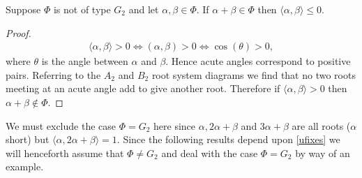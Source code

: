\begin{lemma} \label{ufixes} Suppose $\Phi$ is not of type $G_2$ and let $\alpha,\beta\in\Phi$. If $\alpha + \beta \in \Phi$ then $\langle \alpha, \beta \rangle \leq 0$.
\end{lemma}
\begin{proof}
\begin{eqnarray*}
\langle \alpha, \beta \rangle > 0 \Longleftrightarrow (\alpha, \beta) >0 \Longleftrightarrow \cos(\theta) > 0,
\end{eqnarray*}
where $\theta$ is the angle between $\alpha$ and $\beta$. Hence acute angles correspond to positive pairs. Referring to the $A_2$ and $B_2$ root system diagrams we find that no two roots meeting at an acute angle add to give another root. Therefore if $\langle \alpha, \beta \rangle > 0$ then $\alpha + \beta \notin \Phi$.
\end{proof}

We must exclude the case $\Phi = G_2$ here since $\alpha, 2\alpha + \beta$ and $3\alpha + \beta$ are all roots ($\alpha$ short) but $\langle \alpha, 2\alpha + \beta \rangle = 1$. Since the following results depend upon \ref{ufixes} we will henceforth assume that $\Phi \neq G_2$ and deal with the case $\Phi = G_2$ by way of an example.


